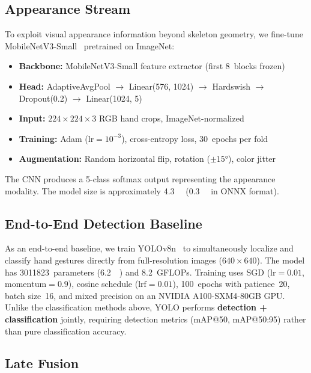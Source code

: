 \documentclass[11pt,a4paper]{article}
\begin{document}
\subsection{Appearance Stream}
\label{sec:appearance}

To exploit visual appearance information beyond skeleton geometry, we fine-tune MobileNetV3-Small~\citep{howard2019mobilenetv3} pretrained on ImageNet:
\begin{itemize}
    \item \textbf{Backbone:} MobileNetV3-Small feature extractor (first 8~blocks frozen)
    \item \textbf{Head:} AdaptiveAvgPool $\to$ Linear(576, 1024) $\to$ Hardswish $\to$ Dropout(0.2) $\to$ Linear(1024, 5)
    \item \textbf{Input:} $224 \times 224 \times 3$ RGB hand crops, ImageNet-normalized
    \item \textbf{Training:} Adam ($\text{lr} = 10^{-3}$), cross-entropy loss, 30~epochs per fold
    \item \textbf{Augmentation:} Random horizontal flip, rotation ($\pm15°$), color jitter
\end{itemize}

\noindent The CNN produces a 5-class softmax output representing the appearance modality. The model size is approximately \SI{4.3}{\mega\byte} (\SI{0.3}{\mega\byte} in ONNX format).

\subsection{End-to-End Detection Baseline}
\label{sec:yolo}

As an end-to-end baseline, we train YOLOv8n~\citep{jocher2023yolo} to simultaneously localize and classify hand gestures directly from full-resolution images ($640 \times 640$). The model has \num{3011823}~parameters (\SI{6.2}{\mega\byte}) and 8.2~GFLOPs. Training uses SGD ($\text{lr} = 0.01$, $\text{momentum} = 0.9$), cosine schedule ($\text{lrf} = 0.01$), 100~epochs with patience~20, batch size~16, and mixed precision on an NVIDIA A100-SXM4-80GB GPU. Unlike the classification methods above, YOLO performs \textbf{detection + classification} jointly, requiring detection metrics (mAP@50, mAP@50:95) rather than pure classification accuracy.

\subsection{Late Fusion}
\label{sec:fusion}
\end{document}

